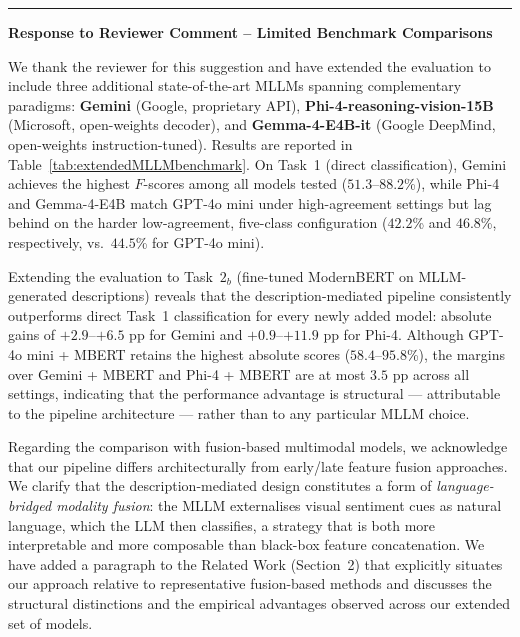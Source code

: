 
\bigskip
\hrule
\bigskip

\noindent\textbf{Response to Reviewer Comment -- Limited Benchmark Comparisons}

\medskip

We thank the reviewer for this suggestion and have extended the evaluation to include
three additional state-of-the-art MLLMs spanning complementary paradigms:
\textbf{Gemini} (Google, proprietary API), \textbf{Phi-4-reasoning-vision-15B}
(Microsoft, open-weights decoder), and \textbf{Gemma-4-E4B-it}
(Google DeepMind, open-weights instruction-tuned).
Results are reported in Table~\ref{tab:extendedMLLMbenchmark}. On Task~1 (direct
classification), Gemini achieves the highest $F$-scores among all models tested
($51.3$--$88.2$\%), while Phi-4 and Gemma-4-E4B match GPT-4o mini under high-agreement
settings but lag behind on the harder low-agreement, five-class configuration
($42.2$\% and $46.8$\%, respectively, vs.\ $44.5$\% for GPT-4o mini).

Extending the evaluation to Task~$2_b$ (fine-tuned ModernBERT on MLLM-generated
descriptions) reveals that the description-mediated pipeline consistently outperforms
direct Task~1 classification for every newly added model:
absolute gains of $+2.9$--$+6.5$ pp for Gemini and $+0.9$--$+11.9$ pp for Phi-4.
Although GPT-4o mini + MBERT retains the highest absolute scores ($58.4$--$95.8$\%),
the margins over Gemini + MBERT and Phi-4 + MBERT are at most $3.5$ pp across all
settings, indicating that the performance advantage is structural --- attributable to
the pipeline architecture --- rather than to any particular MLLM choice.

Regarding the comparison with fusion-based multimodal models, we acknowledge that
our pipeline differs architecturally from early/late feature fusion approaches.
We clarify that the description-mediated design constitutes a form of
\emph{language-bridged modality fusion}: the MLLM externalises visual sentiment cues
as natural language, which the LLM then classifies, a strategy that is both more
interpretable and more composable than black-box feature concatenation.
We have added a paragraph to the Related Work (Section~2) that explicitly situates
our approach relative to representative fusion-based methods
\cite{PANDEY2024111206,das2023image,zhu2022multimodal} and discusses the
structural distinctions and the empirical advantages observed across our extended
set of models.
